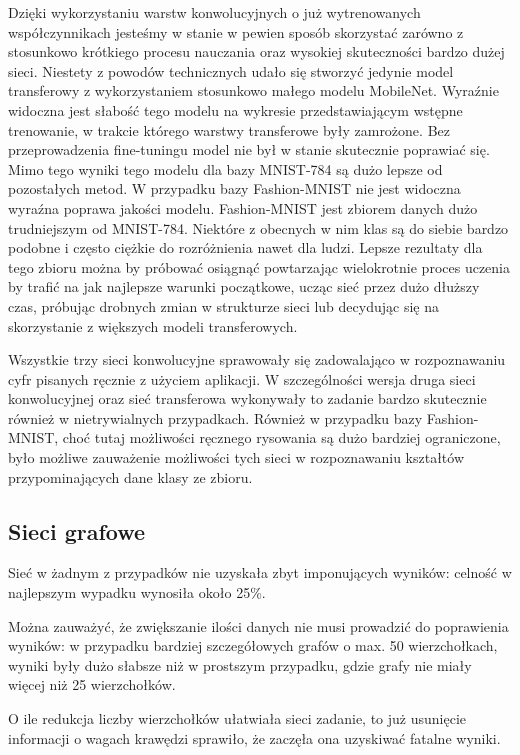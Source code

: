 \documentclass{article}
\begin{document}
Dzięki wykorzystaniu warstw konwolucyjnych o już wytrenowanych 
współczynnikach jesteśmy w stanie w pewien sposób skorzystać zarówno 
z stosunkowo krótkiego procesu nauczania oraz wysokiej skuteczności 
bardzo dużej sieci. Niestety z powodów technicznych udało się stworzyć 
jedynie model transferowy z wykorzystaniem stosunkowo małego modelu 
MobileNet. Wyraźnie widoczna jest słabość tego modelu na wykresie 
przedstawiającym wstępne trenowanie, w trakcie którego warstwy transferowe 
były zamrożone. Bez przeprowadzenia fine-tuningu model nie był w stanie 
skutecznie poprawiać się. Mimo tego wyniki tego modelu dla bazy MNIST-784 
są dużo lepsze od pozostałych metod. W przypadku bazy Fashion-MNIST nie jest 
widoczna wyraźna poprawa jakości modelu. Fashion-MNIST jest zbiorem danych 
dużo trudniejszym od MNIST-784. Niektóre z obecnych w nim klas są do siebie 
bardzo podobne i często ciężkie do rozróżnienia nawet dla ludzi. Lepsze 
rezultaty dla tego zbioru można by próbować osiągnąć powtarzając wielokrotnie 
proces uczenia by trafić na jak najlepsze warunki początkowe, ucząc sieć przez 
dużo dłuższy czas, próbując drobnych zmian w strukturze sieci lub decydując się 
na skorzystanie z większych modeli transferowych.

Wszystkie trzy sieci konwolucyjne sprawowały się zadowalająco w rozpoznawaniu 
cyfr pisanych ręcznie z użyciem aplikacji. W szczególności wersja druga sieci 
konwolucyjnej oraz sieć transferowa wykonywały to zadanie bardzo skutecznie 
również w nietrywialnych przypadkach.
Również w przypadku bazy Fashion-MNIST, choć tutaj możliwości ręcznego rysowania 
są dużo bardziej ograniczone, było możliwe zauważenie możliwości tych sieci w 
rozpoznawaniu kształtów przypominających dane klasy ze zbioru.

\subsection*{Sieci grafowe}

Sieć w żadnym z przypadków nie uzyskała zbyt imponujących
wyników: celność w najlepszym wypadku wynosiła około 25\%.

Można zauważyć, że zwiększanie ilości danych nie musi
prowadzić do poprawienia wyników: w przypadku bardziej
szczegółowych grafów o max. 50 wierzchołkach, wyniki były
dużo słabsze niż w prostszym przypadku, gdzie grafy nie
miały więcej niż 25 wierzchołków.

O ile redukcja liczby wierzchołków ułatwiała sieci zadanie,
to już usunięcie informacji o wagach krawędzi sprawiło,
że zaczęła ona uzyskiwać fatalne wyniki.
\end{document}
